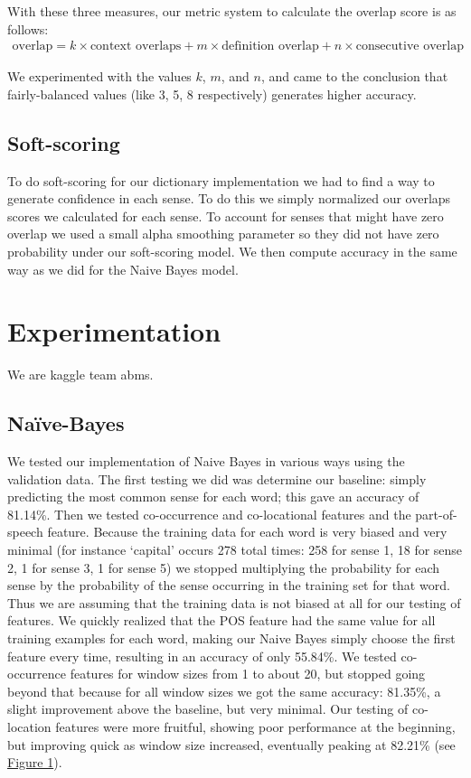 \documentclass{article}
\begin{document}
With these three measures, our metric system to calculate the overlap score is as follows:
\begin{align}
\text{overlap} = k\times\text{context overlaps} + m\times\text{definition overlap} + n\times\text{consecutive overlap}
\end{align}

We experimented with the values $k$, $m$, and $n$, and came to the conclusion that fairly-balanced values (like 3, 5, 8 respectively) generates higher accuracy.

\subsection{Soft-scoring}
To do soft-scoring for our dictionary implementation we had to find a way to generate confidence in each sense. To do this we simply normalized our overlaps scores we calculated for each sense. To account for senses that might have zero overlap we used a small alpha smoothing parameter so they did not have zero probability under our soft-scoring model. We then compute accuracy in the same way as we did for the Naive Bayes model.

\section{Experimentation}
We are kaggle team abms.

\subsection{Na\"{i}ve-Bayes}

We tested our implementation of Naive Bayes in various ways using the validation data. The first testing we did was determine our baseline: simply predicting the most common sense for each word; this gave an accuracy of 81.14\%. Then we tested co-occurrence and co-locational features and the part-of-speech feature. Because the training data for each word is very biased and very minimal (for instance `capital' occurs 278 total times: 258 for sense 1, 18 for sense 2, 1 for sense 3, 1 for sense 5) we stopped multiplying the probability for each sense by the probability of the sense occurring in the training set for that word. Thus we are assuming that the training data is not biased at all for our testing of features. We quickly realized that the POS feature had the same value for all training examples for each word, making our Naive Bayes simply choose the first feature every time, resulting in an accuracy of only 55.84\%. We tested co-occurrence features for window sizes from 1 to about 20, but stopped going beyond that because for all window sizes we got the same accuracy: 81.35\%, a slight improvement above the baseline, but very minimal. Our testing of co-location features were more fruitful, showing poor performance at the beginning, but improving quick as window size increased, eventually peaking at 82.21\% (see \hyperref[fig:col]{Figure 1}).
\end{document}
